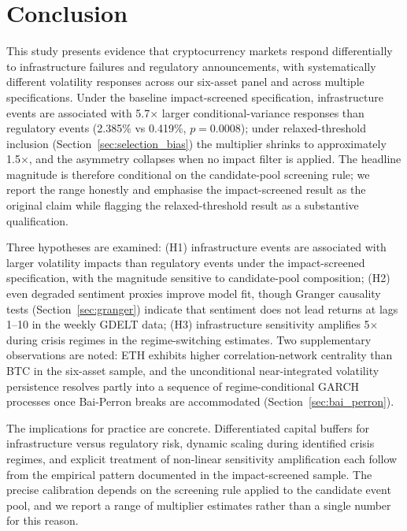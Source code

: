 \documentclass[pdflatex,sn-mathphys-num]{sn-jnl}
\theoremstyle{thmstyleone}
\theoremstyle{thmstyletwo}
\theoremstyle{thmstylethree}
\begin{document}

\section{Conclusion}\label{sec:conclusion}

This study presents evidence that cryptocurrency markets respond differentially to infrastructure failures and regulatory announcements, with systematically different volatility responses across our six-asset panel and across multiple specifications. Under the baseline impact-screened specification, infrastructure events are associated with 5.7$\times$ larger conditional-variance responses than regulatory events (2.385\% vs 0.419\%, $p=0.0008$); under relaxed-threshold inclusion (Section~\ref{sec:selection_bias}) the multiplier shrinks to approximately 1.5$\times$, and the asymmetry collapses when no impact filter is applied. The headline magnitude is therefore conditional on the candidate-pool screening rule; we report the range honestly and emphasise the impact-screened result as the original claim while flagging the relaxed-threshold result as a substantive qualification.

Three hypotheses are examined: (H1) infrastructure events are associated with larger volatility impacts than regulatory events under the impact-screened specification, with the magnitude sensitive to candidate-pool composition; (H2) even degraded sentiment proxies improve model fit, though Granger causality tests (Section~\ref{sec:granger}) indicate that sentiment does not lead returns at lags 1--10 in the weekly GDELT data; (H3) infrastructure sensitivity amplifies 5$\times$ during crisis regimes in the regime-switching estimates. Two supplementary observations are noted: ETH exhibits higher correlation-network centrality than BTC in the six-asset sample, and the unconditional near-integrated volatility persistence resolves partly into a sequence of regime-conditional GARCH processes once Bai-Perron breaks are accommodated (Section~\ref{sec:bai_perron}).

The implications for practice are concrete. Differentiated capital buffers for infrastructure versus regulatory risk, dynamic scaling during identified crisis regimes, and explicit treatment of non-linear sensitivity amplification each follow from the empirical pattern documented in the impact-screened sample. The precise calibration depends on the screening rule applied to the candidate event pool, and we report a range of multiplier estimates rather than a single number for this reason.
\end{document}
